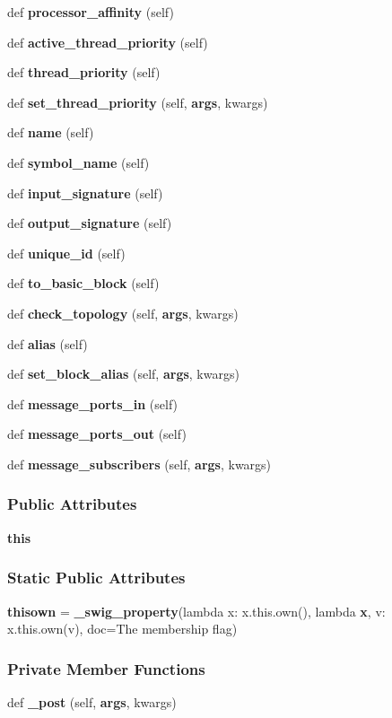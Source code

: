 \begin{DoxyCompactItemize}
def {\bf processor\+\_\+affinity} (self)
\item 
def {\bf active\+\_\+thread\+\_\+priority} (self)
\item 
def {\bf thread\+\_\+priority} (self)
\item 
def {\bf set\+\_\+thread\+\_\+priority} (self, {\bf args}, kwargs)
\item 
def {\bf name} (self)
\item 
def {\bf symbol\+\_\+name} (self)
\item 
def {\bf input\+\_\+signature} (self)
\item 
def {\bf output\+\_\+signature} (self)
\item 
def {\bf unique\+\_\+id} (self)
\item 
def {\bf to\+\_\+basic\+\_\+block} (self)
\item 
def {\bf check\+\_\+topology} (self, {\bf args}, kwargs)
\item 
def {\bf alias} (self)
\item 
def {\bf set\+\_\+block\+\_\+alias} (self, {\bf args}, kwargs)
\item 
def {\bf message\+\_\+ports\+\_\+in} (self)
\item 
def {\bf message\+\_\+ports\+\_\+out} (self)
\item 
def {\bf message\+\_\+subscribers} (self, {\bf args}, kwargs)
\end{DoxyCompactItemize}
\subsubsection*{Public Attributes}
\begin{DoxyCompactItemize}
\item 
{\bf this}
\end{DoxyCompactItemize}
\subsubsection*{Static Public Attributes}
\begin{DoxyCompactItemize}
\item 
{\bf thisown} = {\bf \+\_\+swig\+\_\+property}(lambda x\+: x.\+this.\+own(), lambda {\bf x}, v\+: x.\+this.\+own(v), doc=\textquotesingle{}The membership flag\textquotesingle{})
\end{DoxyCompactItemize}
\subsubsection*{Private Member Functions}
\begin{DoxyCompactItemize}
\item 
def {\bf \+\_\+post} (self, {\bf args}, kwargs)
\end{DoxyCompactItemize}
